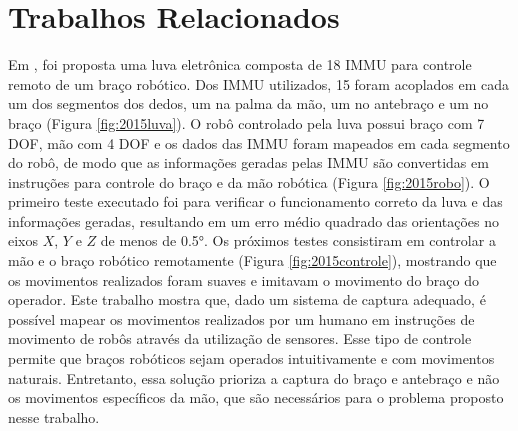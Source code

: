 \section{Trabalhos Relacionados}%
\label{sec:trabrel}%
Em , foi proposta uma luva eletrônica  composta de 18 \ac{IMMU} para controle remoto de um braço robótico. Dos \ac{IMMU} utilizados, 15 foram acoplados em cada um dos segmentos dos dedos, um na palma da mão, um no antebraço e um no braço (Figura \ref{fig:2015luva}). O robô controlado pela luva possui braço com 7 \ac{DOF}, mão com 4 \ac{DOF} e os dados das \ac{IMMU} foram mapeados em cada segmento do robô, de modo que as informações geradas pelas \ac{IMMU} são convertidas em instruções para controle do braço e da mão robótica (Figura \ref{fig:2015robo}). O primeiro teste executado foi para verificar o funcionamento correto da luva e das informações geradas, resultando em um erro médio quadrado das orientações no eixos $X$, $Y$ e $Z$ de menos de \ang{0.5}. Os próximos testes consistiram em controlar a mão e o braço robótico remotamente (Figura \ref{fig:2015controle}), mostrando que os movimentos realizados foram suaves e imitavam o movimento do braço do operador. Este trabalho mostra que, dado um sistema de captura adequado, é possível mapear os movimentos realizados por um humano em instruções de movimento de robôs através da utilização de sensores. Esse tipo de controle permite que braços robóticos sejam operados intuitivamente e com movimentos naturais. Entretanto, essa solução prioriza a captura do braço e antebraço e não os movimentos específicos da mão, que são necessários para o problema proposto nesse trabalho.

